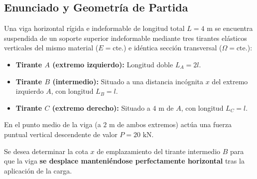 \subsection{Enunciado y Geometría de Partida}

Una viga horizontal rígida e indeformable de longitud total $L = 4\text{ m}$ se encuentra suspendida de un soporte superior indeformable mediante tres tirantes elásticos verticales del mismo material ($E = \text{cte.}$) e idéntica sección transversal ($\Omega = \text{cte.}$):
\begin{itemize}
    \item \textbf{Tirante $A$ (extremo izquierdo):} Longitud doble $L_A = 2l$.
    \item \textbf{Tirante $B$ (intermedio):} Situado a una distancia incógnita $x$ del extremo izquierdo $A$, con longitud $L_B = l$.
    \item \textbf{Tirante $C$ (extremo derecho):} Situado a $4\text{ m}$ de $A$, con longitud $L_C = l$.
\end{itemize}

En el punto medio de la viga (a $2\text{ m}$ de ambos extremos) actúa una fuerza puntual vertical descendente de valor $P = 20\text{ kN}$.

Se desea determinar la cota $x$ de emplazamiento del tirante intermedio $B$ para que la viga \textbf{se desplace manteniéndose perfectamente horizontal} tras la aplicación de la carga.

